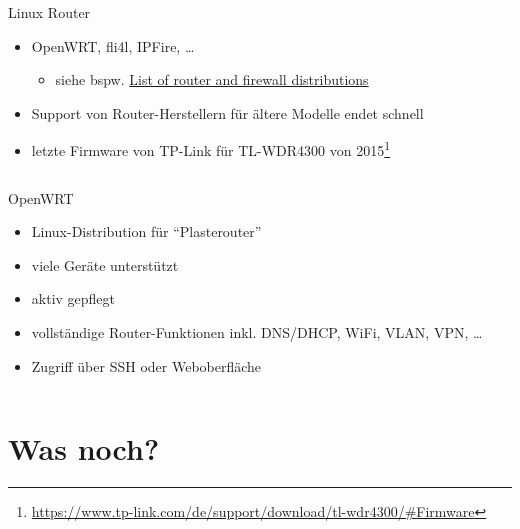 \documentclass[t]{beamer}
\begin{document}
\begin{frame}{Linux Router}
    \begin{itemize}
        \item OpenWRT, fli4l, IPFire, …
            \begin{itemize}
                \item siehe bspw.  \href{https://en.wikipedia.org/wiki/List_of_router_and_firewall_distributions}{List of router and firewall distributions}
            \end{itemize}
        \item Support von Router-Herstellern für ältere Modelle endet
            schnell
        \item letzte Firmware von TP-Link für TL-WDR4300 von
            2015\footnote{\tiny\url{https://www.tp-link.com/de/support/download/tl-wdr4300/\#Firmware}}
    \end{itemize}
    \begin{columns}[b]
        \begin{column}{0.6\textwidth}
            \begin{block}{OpenWRT}
                \begin{itemize}
                    \item Linux-Distribution für \enquote{Plasterouter}
                    \item viele Geräte unterstützt
                    \item aktiv gepflegt
                    \item vollständige Router-Funktionen inkl. DNS/DHCP,
                        WiFi, VLAN, VPN, …
                    \item Zugriff über SSH oder Weboberfläche
                \end{itemize}
            \end{block}
        \end{column}
        \begin{column}{0.35\textwidth}
        \end{column}
    \end{columns}
\end{frame}
\section*{Was noch?}
\end{document}
